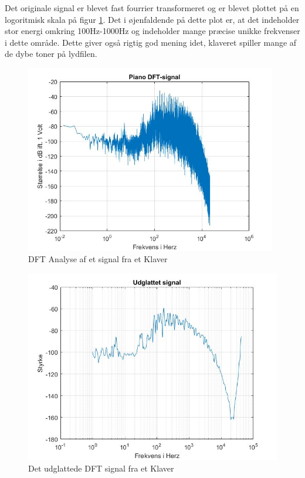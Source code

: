 Det originale signal er blevet fast fourrier transformeret og er blevet plottet på en logoritmisk skala på figur \ref{fig:Klaver DFT}. Det i øjenfaldende på dette plot er, at det indeholder stor energi omkring 100Hz-1000Hz og indeholder mange præcise unikke frekvenser i dette område. Dette giver også rigtig god mening idet, klaveret spiller mange af de dybe toner på lydfilen.
\begin{figure}[H]
	\centering
	\includegraphics[width=110mm]{figures/Piano/DFT.jpg}
	\caption{DFT Analyse af et signal fra et Klaver}
	\label{fig:Klaver DFT}
\end{figure}

\begin{figure}[H]
	\centering
	\includegraphics[width=120mm]{figures/Piano/udglattet.jpg}
	\caption{Det udglattede DFT signal fra et Klaver}
	\label{fig:Klaver udglattet}
\end{figure}
\newpage

